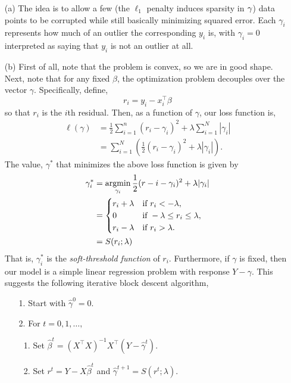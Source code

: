 \begin{itemize}
\item[(a)] The idea is to allow a few (the $\ell_1$ penalty induces sparsity in ${\bf \gamma}$) data points to be corrupted while still basically minimizing squared error. Each $\gamma_i$ represents how much of an outlier the corresponding $y_i$ is, with $\gamma_i=0$ interpreted as saying that $y_i$ is not an outlier at all.

\item[(b)] First of all, note that the problem is convex, so we are in good shape. Next, note that for any fixed $\beta$, the optimization problem decouples over the vector ${\gamma}$. Specifically, define,
\[r_i = y_i - x_i^\top \beta\]
so that $r_i$ is the $i$th residual. Then, as a function of $\gamma$, our loss function is,
\begin{align*}
	\ell({\gamma})&=\frac{1}{2}\sum_{i=1}^n(r_i-\gamma_i)^2 + \lambda \sum_{i=1}^N |\gamma_i | \\
	&=\sum_{i=1}^N \left(\frac{1}{2}(r_i-\gamma_i)^2 +\lambda |\gamma_i|\right). 
\end{align*}
The value, ${\gamma}^*$ that minimizes the above loss function is given by
\begin{align*}
	\gamma_i^* &=\operatorname*{argmin}_{\gamma_i} \frac{1}{2}(r-i-\gamma_i)^2+\lambda|\gamma_i|\\
	&=\begin{cases}
		r_i + \lambda  &\text{if } r_i < -\lambda,\\
		0 & \text{if } -\lambda \le r_i \le \lambda,\\
		r_i - \lambda  & \text{if } r_i > \lambda.
	\end{cases}\\
	&=S(r_i;\lambda)
\end{align*}
That is, $\gamma_i^*$ is the \emph{soft-threshold function} of $r_i$. Furthermore, if ${\gamma}$ is fixed, then our model is a simple linear regression problem with response $Y-{\gamma}$. This suggests the following iterative block descent algorithm,
\begin{enumerate}
	\item[1.] Start with $\hat{\gamma}^0 = 0$.
	\item[2.] For $t=0,1,\ldots,$
	\begin{enumerate}
		\item Set $\hat{\beta}^t = (X^\top X)^{-1}X^\top(Y-\hat{\gamma}^t)$.
		\item Set $r^t = Y - X\hat{\beta}^t$ and $\hat{\gamma}^{t+1} = S(r^t;\lambda)$.

\end{enumerate}
\end{enumerate}
\end{itemize}
